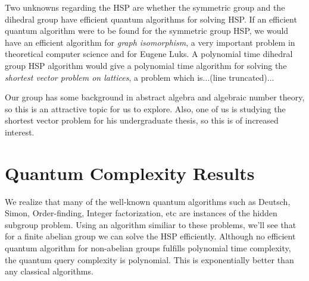 \documentclass[12pt]{article}
\theoremstyle{plain}
\theoremstyle{definition}
\begin{document}
Two unknowns regarding the HSP are whether the symmetric group and the dihedral group have efficient quantum algorithms for solving HSP. If an efficient quantum algorithm were to be found for the symmetric group HSP, we would have an efficient algorithm for \emph{graph isomorphism}, a very important problem in theoretical computer science and for Eugene Luks. A polynomial time dihedral group HSP algorithm would give a polynomial time algorithm for solving the \emph{shortest vector problem on lattices}, a problem which is...(line truncated)...

Our group has some background in abstract algebra and algebraic number theory, so this is an attractive topic for us to explore. Also, one of us is studying the shortest vector problem for his undergraduate thesis, so this is of increased interest.\\
%

%
\section{Quantum Complexity Results}


We realize that many of the well-known quantum algorithms such as Deutsch, Simon, Order-finding, Integer factorization, etc are instances of the hidden subgroup problem. Using an algorithm similiar to these problems, we'll see that for a finite abelian group we can solve the HSP efficiently.
\newline
Although no efficient quantum algorithm for non-abelian groups fulfills polynomial time complexity, the quantum query complexity is polynomial. This is exponentially better than any classical algorithms.

\end{document}
